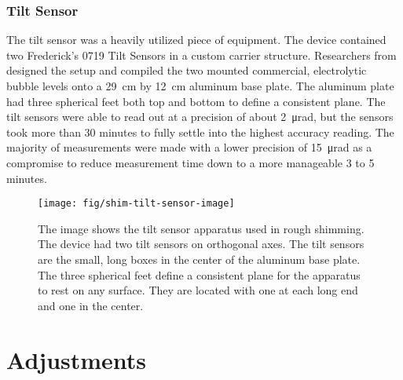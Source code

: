 \subsubsection{Tilt Sensor}
The tilt sensor was a heavily utilized piece of equipment.  The device contained two Frederick's 0719 Tilt Sensors in a custom carrier structure.  Researchers from \uw designed the setup and compiled the two mounted commercial, electrolytic bubble levels onto a \SI{29}{\cm} by \SI{12}{\cm} aluminum base plate. The aluminum plate had three spherical feet both top and bottom to define a consistent plane.  The tilt sensors were able to read out at a precision of about \SI{2}{\micro\radian}, but the sensors took more than 30 minutes to fully settle into the highest accuracy reading.  The majority of measurements were made with a lower precision of \SI{15}{\micro\radian} as a compromise to reduce measurement time down to a more manageable 3 to 5 minutes.

\begin{figure}
\centering
\texttt{[image: fig/shim-tilt-sensor-image]}
\caption{
    The image shows the tilt sensor apparatus used in rough shimming.  The device had two tilt sensors on orthogonal axes.  The tilt sensors are the small, long boxes in the center of the aluminum base plate.  The three spherical feet define a consistent plane for the apparatus to rest on any surface.  They are located with one at each long end and one in the center. 
    \label{fig:shim-tilt-sensor-image}
}
\end{figure}


\section{Adjustments}

